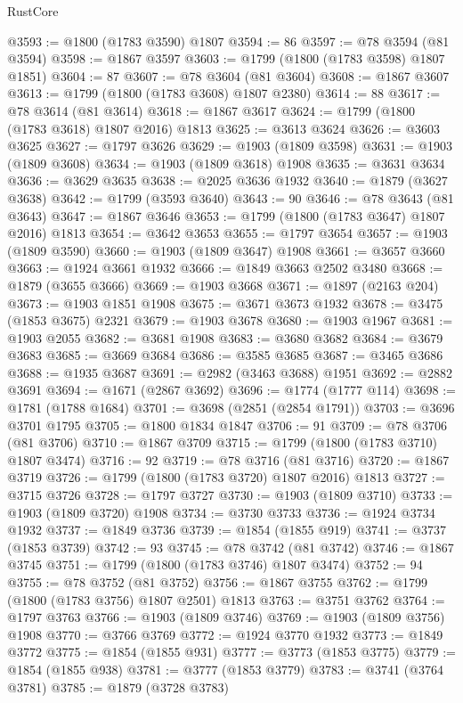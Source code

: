 \begin{lexlean}{RustCore}
\begin{coremodule}
@3593 := @1800 (@1783 @3590) @1807
@3594 := 86
@3597 := @78 @3594 (@81 @3594)
@3598 := @1867 @3597
@3603 := @1799 (@1800 (@1783 @3598) @1807 @1851)
@3604 := 87
@3607 := @78 @3604 (@81 @3604)
@3608 := @1867 @3607
@3613 := @1799 (@1800 (@1783 @3608) @1807 @2380)
@3614 := 88
@3617 := @78 @3614 (@81 @3614)
@3618 := @1867 @3617
@3624 := @1799 (@1800 (@1783 @3618) @1807 @2016) @1813
@3625 := @3613 @3624
@3626 := @3603 @3625
@3627 := @1797 @3626
@3629 := @1903 (@1809 @3598)
@3631 := @1903 (@1809 @3608)
@3634 := @1903 (@1809 @3618) @1908
@3635 := @3631 @3634
@3636 := @3629 @3635
@3638 := @2025 @3636 @1932
@3640 := @1879 (@3627 @3638)
@3642 := @1799 (@3593 @3640)
@3643 := 90
@3646 := @78 @3643 (@81 @3643)
@3647 := @1867 @3646
@3653 := @1799 (@1800 (@1783 @3647) @1807 @2016) @1813
@3654 := @3642 @3653
@3655 := @1797 @3654
@3657 := @1903 (@1809 @3590)
@3660 := @1903 (@1809 @3647) @1908
@3661 := @3657 @3660
@3663 := @1924 @3661 @1932
@3666 := @1849 @3663 @2502 @3480
@3668 := @1879 (@3655 @3666)
@3669 := @1903 @3668
@3671 := @1897 (@2163 @204)
@3673 := @1903 @1851 @1908
@3675 := @3671 @3673 @1932
@3678 := @3475 (@1853 @3675) @2321
@3679 := @1903 @3678
@3680 := @1903 @1967
@3681 := @1903 @2055
@3682 := @3681 @1908
@3683 := @3680 @3682
@3684 := @3679 @3683
@3685 := @3669 @3684
@3686 := @3585 @3685
@3687 := @3465 @3686
@3688 := @1935 @3687
@3691 := @2982 (@3463 @3688) @1951
@3692 := @2882 @3691
@3694 := @1671 (@2867 @3692)
@3696 := @1774 (@1777 @114)
@3698 := @1781 (@1788 @1684)
@3701 := @3698 (@2851 (@2854 @1791))
@3703 := @3696 @3701 @1795
@3705 := @1800 @1834 @1847
@3706 := 91
@3709 := @78 @3706 (@81 @3706)
@3710 := @1867 @3709
@3715 := @1799 (@1800 (@1783 @3710) @1807 @3474)
@3716 := 92
@3719 := @78 @3716 (@81 @3716)
@3720 := @1867 @3719
@3726 := @1799 (@1800 (@1783 @3720) @1807 @2016) @1813
@3727 := @3715 @3726
@3728 := @1797 @3727
@3730 := @1903 (@1809 @3710)
@3733 := @1903 (@1809 @3720) @1908
@3734 := @3730 @3733
@3736 := @1924 @3734 @1932
@3737 := @1849 @3736
@3739 := @1854 (@1855 @919)
@3741 := @3737 (@1853 @3739)
@3742 := 93
@3745 := @78 @3742 (@81 @3742)
@3746 := @1867 @3745
@3751 := @1799 (@1800 (@1783 @3746) @1807 @3474)
@3752 := 94
@3755 := @78 @3752 (@81 @3752)
@3756 := @1867 @3755
@3762 := @1799 (@1800 (@1783 @3756) @1807 @2501) @1813
@3763 := @3751 @3762
@3764 := @1797 @3763
@3766 := @1903 (@1809 @3746)
@3769 := @1903 (@1809 @3756) @1908
@3770 := @3766 @3769
@3772 := @1924 @3770 @1932
@3773 := @1849 @3772
@3775 := @1854 (@1855 @931)
@3777 := @3773 (@1853 @3775)
@3779 := @1854 (@1855 @938)
@3781 := @3777 (@1853 @3779)
@3783 := @3741 (@3764 @3781)
@3785 := @1879 (@3728 @3783)

\end{coremodule}
\end{lexlean}
